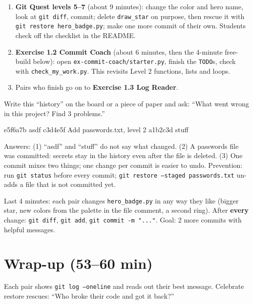 \begin{enumerate}[itemsep=2pt]
  \item \textbf{Git Quest levels 5--7} (about 9 minutes): change the color and hero name, look at \texttt{git diff}, commit; delete \texttt{draw\_star} on purpose, then rescue it with \texttt{git restore hero\_badge.py}; make one more commit of their own. Students check off the checklist in the README.
  \item \textbf{Exercise 1.2 Commit Coach} (about 6 minutes, then the 4-minute free-build below): open \texttt{ex-commit-coach/starter.py}, finish the \texttt{TODO}s, check with \texttt{check\_my\_work.py}. This revisits Level 2 functions, lists and loops.
  \item Pairs who finish go on to \textbf{Exercise 1.3 Log Reader}.
\end{enumerate}

\begin{bughunt}
Write this \enquote{history} on the board or a piece of paper and ask: \enquote{What went wrong in this project? Find 3 problems.}
\begin{outputcode}
e5f6a7b asdf
c3d4e5f Add passwords.txt, level 2
a1b2c3d stuff
\end{outputcode}
Answers: (1) \enquote{asdf} and \enquote{stuff} do not say what changed. (2) A passwords file was committed: secrets stay in the history even after the file is deleted. (3) One commit mixes two things; one change per commit is easier to undo. Prevention: run \texttt{git status} before every commit; \texttt{git restore --staged passwords.txt} un-adds a file that is not committed yet.
\end{bughunt}

\begin{freebuild}
Last 4 minutes: each pair changes \texttt{hero\_badge.py} in any way they like (bigger star, new colors from the palette in the file comment, a second ring). After \textbf{every} change: \texttt{git diff}, \texttt{git add}, \texttt{git commit -m "..."}. Goal: 2 more commits with helpful messages.
\end{freebuild}

\section{Wrap-up (53--60 min)}
Each pair shows \texttt{git log --oneline} and reads out their best message. Celebrate restore rescues: \enquote{Who broke their code and got it back?}

